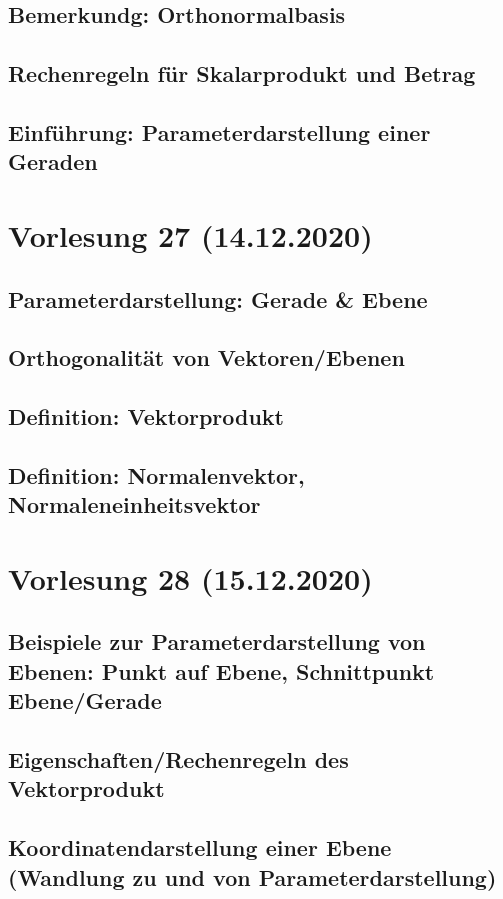 \documentclass[]{article}
\begin{document}
\subsection{Bemerkundg: Orthonormalbasis}
\subsection{Rechenregeln für Skalarprodukt und Betrag}
\subsection{Einführung: Parameterdarstellung einer Geraden}


\section{Vorlesung 27 (14.12.2020)}
\subsection{Parameterdarstellung: Gerade \& Ebene}
\subsection{Orthogonalität von Vektoren/Ebenen}
\subsection{Definition: Vektorprodukt}
\subsection{Definition: Normalenvektor, Normaleneinheitsvektor}


\section{Vorlesung 28 (15.12.2020)}
\subsection{Beispiele zur Parameterdarstellung von Ebenen: Punkt auf Ebene, Schnittpunkt Ebene/Gerade}
\subsection{Eigenschaften/Rechenregeln des Vektorprodukt}
\subsection{Koordinatendarstellung einer Ebene (Wandlung zu und von Parameterdarstellung)}
\end{document}
